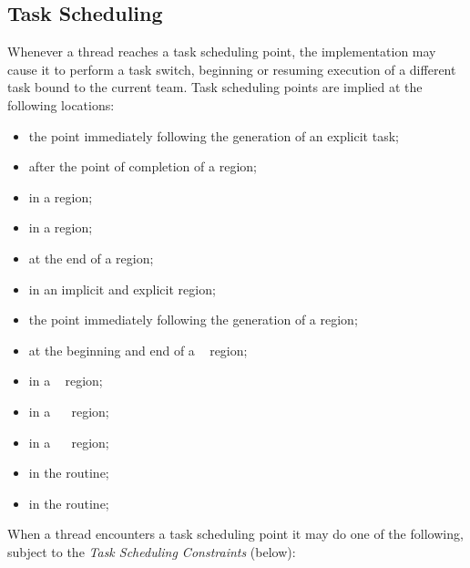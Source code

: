 \subsection{Task Scheduling}
\label{subsec:Task Scheduling}
Whenever a thread reaches a task scheduling point, the implementation may cause it to 
perform a task switch, beginning or resuming execution of a different task bound to the 
current team. Task scheduling points are implied at the following locations:

\begin{itemize}
\item the point immediately following the generation of an explicit task;

\item after the point of completion of a  region;

\item in a  region;

\item in a  region;

\item at the end of a  region;

\item in an implicit and explicit  region;

\item the point immediately following the generation of a  region;

\item at the beginning and end of a ~ region;

\item in a ~ region; 

\item in a ~~ region; 

\item in a ~~ region; 

\item in the  routine; 

\item in the  routine;

\end{itemize}

When a thread encounters a task scheduling point it may do one of the following, 
subject to the \emph{Task Scheduling Constraints} (below):


